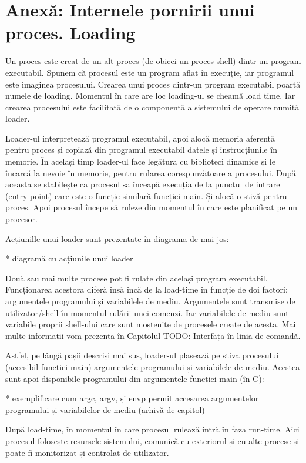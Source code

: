 \section{Anexă: Internele pornirii unui proces. Loading}

Un proces este creat de un alt proces (de obicei un proces shell) dintr-un
program executabil. Spunem că procesul este un program aflat în execuție, iar
programul este imaginea procesului. Crearea unui proces dintr-un program
executabil poartă numele de loading. Momentul în care are loc loading-ul se
cheamă load time. Iar crearea procesului este facilitată de o componentă a
sistemului de operare numită loader.

Loader-ul interpretează programul executabil, apoi alocă memoria aferentă pentru
proces și copiază din programul executabil datele și instrucțiunile în memorie.
În același timp loader-ul face legătura cu biblioteci dinamice și le încarcă la
nevoie în memorie, pentru rularea corespunzătoare a procesului. După aceasta se
stabilește ca procesul să înceapă execuția de la punctul de intrare (entry
point) care este o funcție similară funcției main. Și alocă o stivă pentru
proces. Apoi procesul începe să ruleze din momentul în care este planificat pe
un procesor.

Acțiunille unui loader sunt prezentate în diagrama de mai jos:

* diagramă cu acțiunile unui loader

Două sau mai multe procese pot fi rulate din același program executabil.
Funcționarea acestora diferă însă încă de la load-time în funcție de doi
factori: argumentele programului și variabilele de mediu. Argumentele sunt
transmise de utilizator/shell în momentul rulării unei comenzi. Iar variabilele
de mediu sunt variabile proprii shell-ului care sunt moștenite de procesele
create de acesta. Mai multe informații vom prezenta în Capitolul TODO: Interfața
în linia de comandă.

Astfel, pe lângă pașii descriși mai sus, loader-ul plasează pe stiva procesului
(accesibil funcției main) argumentele programului și variabilele de mediu.
Acestea sunt apoi disponibile programului din argumentele funcției main (în C):

* exemplificare cum argc, argv, și envp permit accesarea argumentelor programului și variabilelor de mediu (arhivă de capitol)

După load-time, în momentul în care procesul rulează intră în faza run-time.
Aici procesul folosește resursele sistemului, comunică cu exteriorul și cu alte
procese și poate fi monitorizat și controlat de utilizator.

